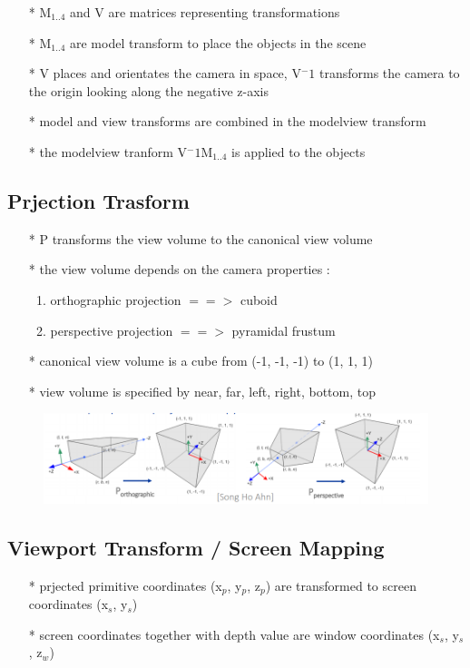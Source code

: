 \documentclass[12pt, a4paper]{article}
\begin{document}
\begin{itemize}
  \item[*] M$_{1..4}$ and V are matrices representing transformations
  \item[*] M$_{1..4}$ are model transform to place the objects in the scene
  \item[*] V places and orientates the camera in space, V$^-1$ transforms the camera to the origin looking along the negative z-axis
  \item[*] model and view transforms are combined in the modelview transform
  \item[*] the modelview tranform V$^-1$M$_{1..4}$ is applied to the objects
\end{itemize}

\subsection{Prjection Trasform}
\begin{itemize}
  \item[*] P transforms the view volume to the canonical view volume
  \item[*] the view volume depends on the camera properties : \begin{enumerate}
    \item orthographic projection $==>$ cuboid
    \item perspective projection $==>$ pyramidal frustum
  \end{enumerate}
  \item[*] canonical view volume is a cube from (-1, -1, -1) to (1, 1, 1)
  \item[*] view volume is specified by near, far, left, right, bottom, top
\end{itemize}
\begin{figure}[!ht]
  \centering
  \includegraphics[width=\textwidth]{image/projectionTrasform}
  \label{}
\end{figure}

\subsection{Viewport Transform / Screen Mapping}
\begin{itemize}
  \item[*] prjected primitive coordinates (x$_p$, y$_p$, z$_p$) are transformed to screen coordinates (x$_s$, y$_s$)
  \item[*] screen coordinates together with depth value are window coordinates (x$_s$, y$_s$, z$_w$)
\end{itemize}
\end{document}
